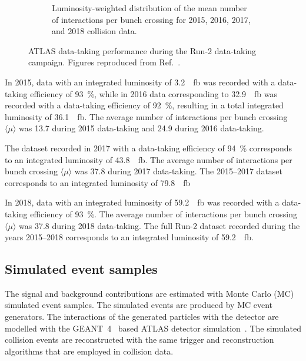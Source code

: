 \begin{figure}[htbp]
\begin{subfigure}{1.\textwidth}
      \caption{Luminosity-weighted distribution of the mean number of interactions per bunch crossing for 2015, 2016, 2017, and 2018 \HepProcess{\Pp\Pp} collision data.}
    \end{subfigure}
    \caption{ATLAS data-taking performance during the Run-2 \HepProcess{\Pp\Pp} data-taking campaign. Figures reproduced from Ref.~\cite{DAPR-2018-01}.}
    \label{fig:common:data:data}
\end{figure}

In 2015, data with an integrated luminosity of \SI{3.2}{\per\femto\barn} was recorded with a data-taking efficiency of \SI{93}{\percent}, while in 2016 data corresponding to \SI{32.9}{\per\femto\barn} was recorded with a data-taking efficiency of \SI{92}{\percent}, resulting in a total integrated luminosity of \SI{36.1}{\per\femto\barn}.
The average number of interactions per bunch crossing \(\langle \mu \rangle\) was \num{13.7} during 2015 data-taking and \num{24.9} during 2016 data-taking.

The dataset recorded in 2017 with a data-taking efficiency of \SI{94}{\percent} corresponds to an integrated luminosity of \SI{43.8}{\per\femto\barn}.
The average number of interactions per bunch crossing \(\langle \mu \rangle\) was \num{37.8} during 2017 data-taking.
The 2015--2017 dataset corresponds to an integrated luminosity of \SI{79.8}{\per\femto\barn}

In 2018, data with an integrated luminosity of \SI{59.2}{\per\femto\barn} was recorded with a data-taking efficiency of \SI{93}{\percent}.
The average number of interactions per bunch crossing \(\langle \mu \rangle\) was \num{37.8} during 2018 data-taking.
The full Run-2 dataset recorded during the years 2015--2018 corresponds to an integrated luminosity of \SI{59.2}{\per\femto\barn}.


\subsection{Simulated event samples}
\label{sec:common:data:mc}
The signal and background contributions are estimated with Monte Carlo (MC) simulated event samples.
The simulated events are produced by MC event generators. The interactions of the generated particles with the detector are modelled with the \textsc{GEANT}~4~\cite{Agostinelli:2002hh} based ATLAS detector simulation~\cite{SOFT-2010-01}. The simulated collision events are reconstructed with the same trigger and reconstruction algorithms that are employed in collision data.

